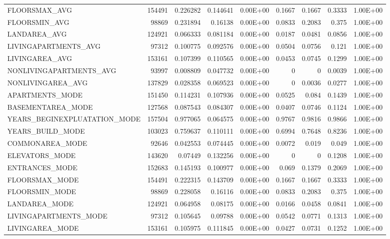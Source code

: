 \documentclass[12pt, letterpaper]{article}
\begin{document}
\begin{appendices}
{\begin{longtable}[c]{| l || r | r | r | r | r | r | r | r |}
 FLOORSMAX_AVG	&	154491	&	0.226282	&	0.144641	&	0.00E+00	&	0.1667	&	0.1667	&	0.3333	&	1.00E+00	\\
 FLOORSMIN_AVG	&	98869	&	0.231894	&	0.16138	&	0.00E+00	&	0.0833	&	0.2083	&	0.375	&	1.00E+00	\\
 LANDAREA_AVG	&	124921	&	0.066333	&	0.081184	&	0.00E+00	&	0.0187	&	0.0481	&	0.0856	&	1.00E+00	\\
 LIVINGAPARTMENTS_AVG	&	97312	&	0.100775	&	0.092576	&	0.00E+00	&	0.0504	&	0.0756	&	0.121	&	1.00E+00	\\
 LIVINGAREA_AVG	&	153161	&	0.107399	&	0.110565	&	0.00E+00	&	0.0453	&	0.0745	&	0.1299	&	1.00E+00	\\
 NONLIVINGAPARTMENTS_AVG	&	93997	&	0.008809	&	0.047732	&	0.00E+00	&	0	&	0	&	0.0039	&	1.00E+00	\\
 NONLIVINGAREA_AVG	&	137829	&	0.028358	&	0.069523	&	0.00E+00	&	0	&	0.0036	&	0.0277	&	1.00E+00	\\
 APARTMENTS_MODE	&	151450	&	0.114231	&	0.107936	&	0.00E+00	&	0.0525	&	0.084	&	0.1439	&	1.00E+00	\\
 BASEMENTAREA_MODE	&	127568	&	0.087543	&	0.084307	&	0.00E+00	&	0.0407	&	0.0746	&	0.1124	&	1.00E+00	\\
 YEARS_BEGINEXPLUATATION_MODE	&	157504	&	0.977065	&	0.064575	&	0.00E+00	&	0.9767	&	0.9816	&	0.9866	&	1.00E+00	\\
 YEARS_BUILD_MODE	&	103023	&	0.759637	&	0.110111	&	0.00E+00	&	0.6994	&	0.7648	&	0.8236	&	1.00E+00	\\
 COMMONAREA_MODE	&	92646	&	0.042553	&	0.074445	&	0.00E+00	&	0.0072	&	0.019	&	0.049	&	1.00E+00	\\
 ELEVATORS_MODE	&	143620	&	0.07449	&	0.132256	&	0.00E+00	&	0	&	0	&	0.1208	&	1.00E+00	\\
 ENTRANCES_MODE	&	152683	&	0.145193	&	0.100977	&	0.00E+00	&	0.069	&	0.1379	&	0.2069	&	1.00E+00	\\
 FLOORSMAX_MODE	&	154491	&	0.222315	&	0.143709	&	0.00E+00	&	0.1667	&	0.1667	&	0.3333	&	1.00E+00	\\
 FLOORSMIN_MODE	&	98869	&	0.228058	&	0.16116	&	0.00E+00	&	0.0833	&	0.2083	&	0.375	&	1.00E+00	\\
 LANDAREA_MODE	&	124921	&	0.064958	&	0.08175	&	0.00E+00	&	0.0166	&	0.0458	&	0.0841	&	1.00E+00	\\
 LIVINGAPARTMENTS_MODE	&	97312	&	0.105645	&	0.09788	&	0.00E+00	&	0.0542	&	0.0771	&	0.1313	&	1.00E+00	\\
 LIVINGAREA_MODE	&	153161	&	0.105975	&	0.111845	&	0.00E+00	&	0.0427	&	0.0731	&	0.1252	&	1.00E+00	\\

\end{longtable}}
\end{appendices}
\end{document}
